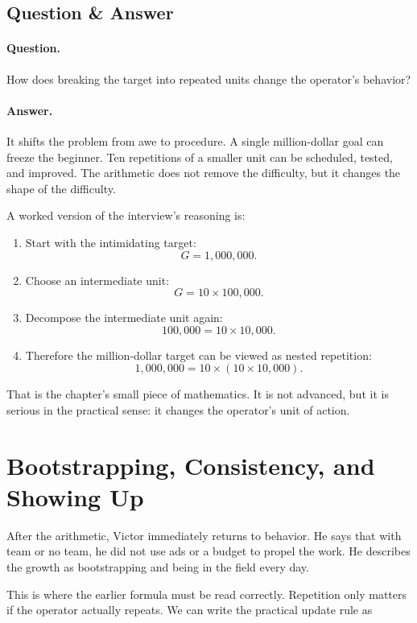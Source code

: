 \subsection{Question \& Answer}

\paragraph{Question.}
How does breaking the target into repeated units change the operator's behavior?

\paragraph{Answer.}
It shifts the problem from awe to procedure. A single million-dollar goal can freeze the beginner. Ten repetitions of a smaller unit can be scheduled, tested, and improved. The arithmetic does not remove the difficulty, but it changes the shape of the difficulty.

A worked version of the interview's reasoning is:

\begin{enumerate}
\item Start with the intimidating target:
\[
G = 1{,}000{,}000.
\]
\item Choose an intermediate unit:
\[
G = 10 \times 100{,}000.
\]
\item Decompose the intermediate unit again:
\[
100{,}000 = 10 \times 10{,}000.
\]
\item Therefore the million-dollar target can be viewed as nested repetition:
\[
1{,}000{,}000
=
10 \times (10 \times 10{,}000).
\]
\end{enumerate}

That is the chapter's small piece of mathematics. It is not advanced, but it is serious in the practical sense: it changes the operator's unit of action.

\section{Bootstrapping, Consistency, and Showing Up}

After the arithmetic, Victor immediately returns to behavior. He says that with team or no team, he did not use ads or a budget to propel the work. He describes the growth as bootstrapping and being in the field every day.

This is where the earlier formula must be read correctly. Repetition only matters if the operator actually repeats. We can write the practical update rule as


